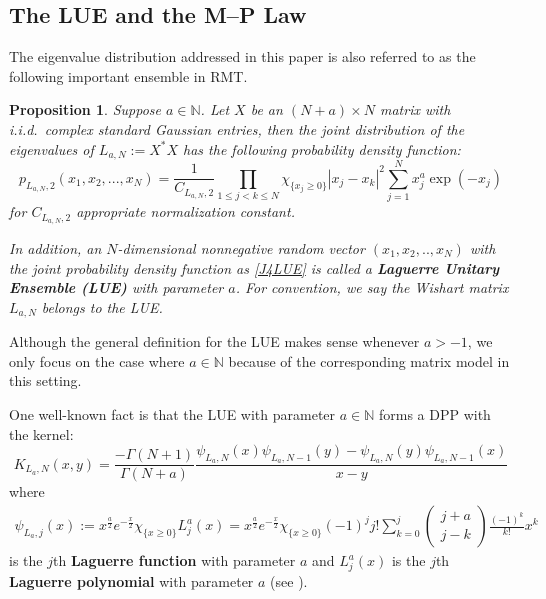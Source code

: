 \documentclass[11pt]{article}
\newtheorem{proposition}[theorem]{Proposition}
\numberwithin{equation}{section}%
\numberwithin{theorem}{section}
\begin{document}
\subsection{The LUE and the M--P Law}
The eigenvalue distribution addressed in this paper is also referred to as the following important ensemble in RMT.
\begin{proposition}\label{ei4LUE}\cite[Proposition $3.2.2$]{log-gas}
   Suppose $a\in\mathbb{N}$. Let $X$ be an $(N+a)\times N$ matrix with i.i.d.\ complex standard Gaussian entries, then the joint distribution of the eigenvalues of $L_{a,N}:=X^*X$ has the following probability density function:
    \begin{equation}\label{J4LUE}
        p_{L_{a,N},2}(x_1,x_2,...,x_N)=\frac{1}{C_{L_{a,N},2}}\prod_{1\le j< k\le N}\chi_{\{x_j\ge0\}}|x_j-x_k|^2\sum_{j=1}^N x_j^a\exp(-x_j)
    \end{equation}
    for $C_{L_{a,N},2}$ appropriate normalization constant.
    
    In addition, an $N$-dimensional nonnegative random vector $(x_1,x_2,..,x_N)$ with the joint probability density function as \eqref{J4LUE} is called a \textbf{Laguerre Unitary Ensemble (LUE)} with parameter $a$.
   For convention, we say the Wishart matrix $L_{a,N}$ belongs to the LUE.
\end{proposition}
Although the general definition for the LUE makes sense whenever $a>-1$, we only focus on the case where $a\in\mathbb{N}$ because of the corresponding matrix model in this setting.

One well-known fact is that the LUE with parameter $a\in\mathbb{N}$ forms a DPP with the kernel:
\begin{equation}\label{LUE kernel}
    K_{L_a,N}(x,y)=\frac{-\Gamma(N+1)}{\Gamma(N+a)}\frac{\psi_{L_a,N}(x)\psi_{L_a,N-1}(y)-\psi_{L_a,N}(y)\psi_{L_a,N-1}(x)}{x-y}
\end{equation}
where
\begin{equation*}
\begin{split}
       \psi_{L_a,j}(x):=x^{\frac{a}{2}}e^{-\frac{x}{2}}\chi_{\{x\ge0\}}L_j^a(x)=x^{\frac{a}{2}}e^{-\frac{x}{2}}\chi_{\{x\ge0\}}(-1)^j j!\sum_{k=0}^j\left(\begin{matrix}
        j+a\\j-k
    \end{matrix}\right)\frac{(-1)^k}{k!}x^k
\end{split}
\end{equation*}
is the $j$th \textbf{Laguerre function} with parameter $a$ and $L_j^a(x)$
is the $j$th \textbf{Laguerre polynomial} with parameter $a$ (see \cite[Equations $(5.46)~to~(5.48)$]{log-gas}).
\end{document}
